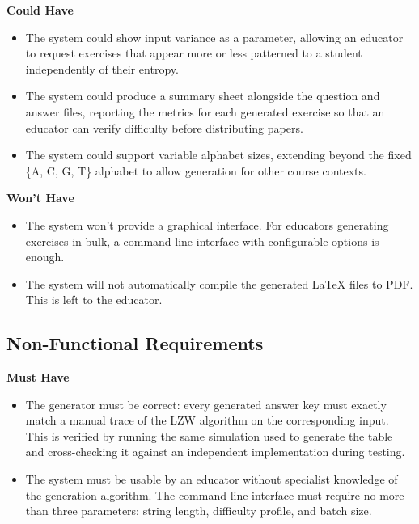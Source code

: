 \documentclass{l4proj}
\begin{document}
\textbf{Could Have}

\begin{itemize}
    \item The system could show input variance as a parameter, allowing an educator to request exercises that appear more or less patterned to a student independently of their entropy.

    \item The system could produce a summary sheet alongside the question and answer files, reporting the metrics for each generated exercise so that an educator can verify difficulty before distributing papers.

    \item The system could support variable alphabet sizes, extending beyond the fixed \{A, C, G, T\} alphabet to allow generation for other course contexts.
\end{itemize}

\textbf{Won't Have}

\begin{itemize}
    \item The system won’t provide a graphical interface. For educators generating exercises in bulk, a command-line interface with configurable options is enough.

    \item The system will not automatically compile the generated LaTeX files to PDF. This is left to the educator.
\end{itemize}

\subsection{Non-Functional Requirements}

\textbf{Must Have}

\begin{itemize}
    \item The generator must be correct: every generated answer key must exactly match a manual trace of the LZW algorithm on the corresponding input. This is verified by running the same simulation used to generate the table and cross-checking it against an independent implementation during testing.

    \item The system must be usable by an educator without specialist knowledge of the generation algorithm. The command-line interface must require no more than three parameters: string length, difficulty profile, and batch size.
\end{itemize}
\end{document}
